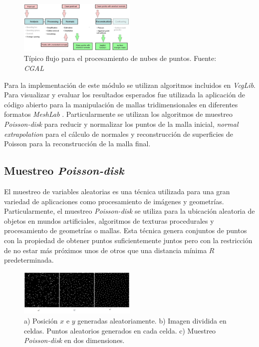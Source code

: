 \begin{figure}[H]
  \centering
    \includegraphics[width=0.5\textwidth]{./Cap6_reconstruccion/malla-flow.png}
  \caption{Típico flujo para el procesamiento de nubes de puntos. Fuente: \emph{CGAL}}%
  \label{fig:Mesh-CGAL}
\end{figure}

Para la implementación de este módulo se utilizan algoritmos incluidos en \emph{VcgLib}. Para visualizar y evaluar los resultados esperados fue utilizada la aplicación de código abierto para la manipulación de mallas tridimensionales en diferentes formatos \emph{MeshLab} \cite{MeshLab}. Particularmente se utilizan los algoritmos de muestreo \emph{Poisson-disk} para reducir y normalizar los puntos de la malla inicial, \emph{normal extrapolation} para el cálculo de normales y reconstrucción de superficies de Poisson para la reconstrucción de la malla final.

\subsection{Muestreo \emph{Poisson-disk}}

El muestreo de variables aleatorias es una técnica utilizada para una gran variedad de aplicaciones como procesamiento de imágenes y geometrías. Particularmente, el muestreo \emph{Poisson-disk} se utiliza para la ubicación aleatoria de objetos en mundos artificiales, algoritmos de texturas procedurales y procesamiento de geometrías o mallas.%
Esta técnica genera conjuntos de puntos con la propiedad de obtener puntos suficientemente juntos pero con la restricción de no estar más próximos unos de otros que una distancia mínima $R$ predeterminada.

\begin{figure}[H]
  \centering
    \includegraphics[width=0.5\textwidth]{./Cap6_reconstruccion/malla-poisson.png}
  \caption{a) Posición $x$ e $y$ generadas aleatoriamente. b) Imagen dividida en celdas. Puntos aleatorios generados en cada celda. c) Muestreo \emph{Poisson-disk} en dos dimensiones.}
  \label{fig:Mesh-Poisson}
\end{figure}

